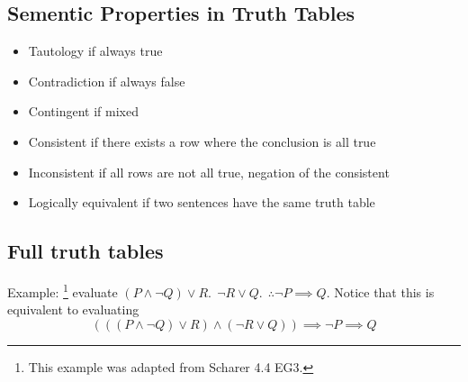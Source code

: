 \documentclass[11pt]{article}
\begin{document}
\subsection{Sementic Properties in Truth Tables}
\begin{itemize}
    \item Tautology if always true
    \item Contradiction if always false 
    \item Contingent if mixed
    \item Consistent if there exists a row where the conclusion is all true
    \item Inconsistent if all rows are not all true, negation of the consistent
    \item Logically equivalent if two sentences have the same truth table
\end{itemize}



\subsection{Full truth tables}
Example: \footnote{This example was adapted from Scharer 4.4 EG3.}
evaluate $(P\land \neg Q)\vee R. ~~\neg R\vee Q. ~~\therefore \neg P\implies Q$. 
Notice that this is equivalent to evaluating
\begin{equation*}
    \left(\left(\left(P\land \neg Q\right)\vee R \right) \land 
    \left(\neg R\vee Q\right)\right) \implies \neg P\implies Q
\end{equation*}
\end{document}
